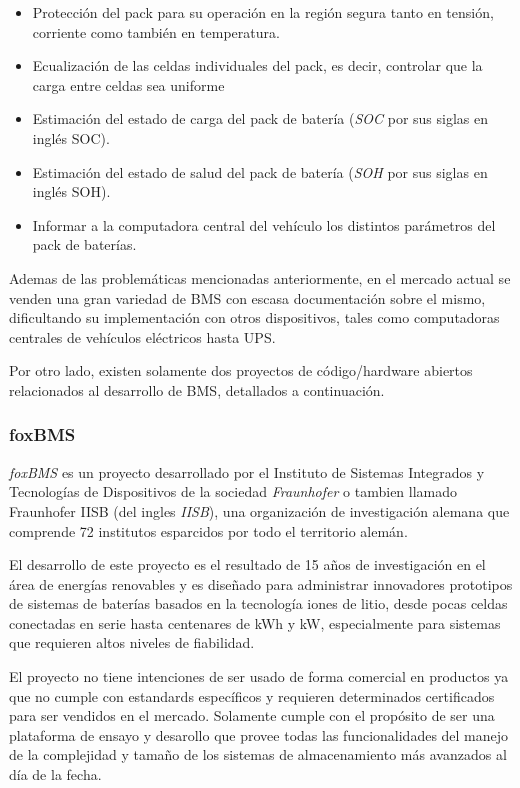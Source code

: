 \documentclass[10pt, a4paper]{article}
\begin{document}
\begin{itemize}
    \item Protección del pack para su operación en la región segura tanto 
        en tensión, corriente como también en temperatura.
    \item Ecualización de las celdas individuales del pack, es decir,
        controlar que la carga entre celdas sea uniforme
    \item Estimación del estado de carga del pack de batería 
        (\emph{\acrshort{SOC}} por sus siglas en ingl\'es \acrlong{SOC}).
    \item Estimación del estado de salud del pack de batería 
        (\emph{\acrshort{SOH}} por sus siglas en ingl\'es \acrlong{SOH}).
    \item Informar a la computadora central del vehículo los distintos 
        parámetros del pack de baterías.
\end{itemize}

\noindent Ademas de las problem\'aticas mencionadas anteriormente, en el mercado
actual se venden una gran variedad de \acrshort{BMS} con escasa documentaci\'on
sobre el mismo, dificultando su implementaci\'on con otros dispositivos, tales 
como computadoras centrales de veh\'iculos el\'ectricos hasta \acrshort{UPS}.

Por otro lado, existen solamente dos proyectos de c\'odigo/hardware abiertos
relacionados al desarrollo de \acrshort{BMS}, detallados a continuaci\'on.

\subsubsection{foxBMS}

\emph{foxBMS} \cite{foxbms} es un proyecto desarrollado por el Instituto de Sistemas
Integrados y Tecnolog\'ias de Dispositivos de la sociedad \emph{Fraunhofer} o
tambien llamado Fraunhofer IISB (del ingles \emph{\acrlong{IISB}}), una
organización de investigación alemana que comprende 72 institutos esparcidos por
todo el territorio alem\'an.

\noindent El desarrollo de este proyecto es el resultado de 15 años de
investigaci\'on en el \'area de energ\'ias renovables y es diseñado para 
administrar innovadores prototipos de sistemas de bater\'ias basados en la 
tecnolog\'ia iones de litio, desde pocas celdas conectadas en serie hasta 
centenares de kWh y kW, especialmente para sistemas que requieren altos niveles 
de fiabilidad.

\noindent El proyecto no tiene intenciones de ser usado de forma comercial en
productos ya que no cumple con estandards espec\'ificos y requieren determinados
certificados para ser vendidos en el mercado. Solamente cumple con el 
prop\'osito de ser una plataforma de ensayo y desarollo que provee todas las 
funcionalidades del manejo de la complejidad y tamaño de los sistemas de 
almacenamiento más avanzados al d\'ia de la fecha.
\end{document}
